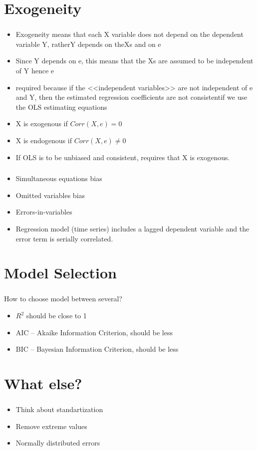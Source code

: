 \documentclass[t, 11pt]{beamer}
\begin{document}
	\section{Exogeneity}
\begin{frame} 
	\frametitle{\insertsection} 
	
	\begin{itemize}
		\item Exogeneity means that each X variable does not depend on the dependent variable Y, ratherY depends on theXs and on e
		\item Since Y depends on e, this means that the Xs are assumed to be independent of Y hence e
		\item required because if the <<independent variables>> are not independent of e and Y, then the estimated regression coefficients are not consistentif we use the OLS estimating equations
		
		\item X is exogenous if $Corr(X, e) = 0$
		\item X is endogenous if $Corr(X, e) \neq 0$
		\item If OLS is to be unbiased and consistent, requires that X is exogenous.
	\end{itemize}
	
\end{frame}	

\begin{frame} 
	\frametitle{\insertsection} 
	
	\begin{itemize}
		\item Simultaneous equations bias
		\item Omitted variables bias
		\item Errors-in-variables
		\item Regression model (time series) includes a lagged dependent variable and the error term is serially correlated.
	\end{itemize}
	
\end{frame}	

	\section{Model Selection}
\begin{frame} 
	\frametitle{\insertsection} 
	How to choose model between several?
	\begin{itemize}
		\item $R^2$ should be close to 1 
		\item AIC – Akaike Information Criterion, should be less
		\item BIC – Bayesian Information Criterion, should be less
		\end{itemize}
\end{frame}	

\section{What else?}
\begin{frame} 
	\frametitle{\insertsection} 
	\begin{itemize}
		\item Think about standartization
		\item Remove extreme values
		\item Normally distributed errors
	\end{itemize}
\end{frame}	
	
\end{document}
